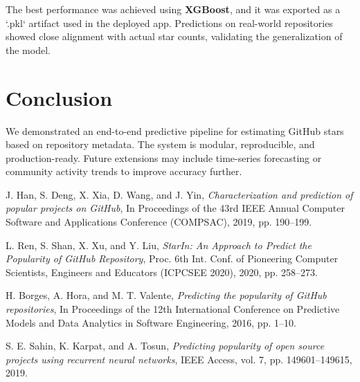 \documentclass[12pt,a4paper]{article}
\begin{document}
The best performance was achieved using \textbf{XGBoost}, and it was exported as a `.pkl` artifact used in the deployed app. Predictions on real-world repositories showed close alignment with actual star counts, validating the generalization of the model.

\section{Conclusion}
We demonstrated an end-to-end predictive pipeline for estimating GitHub stars based on repository metadata. The system is modular, reproducible, and production-ready. Future extensions may include time-series forecasting or community activity trends to improve accuracy further.

\begin{thebibliography}{9}

J. Han, S. Deng, X. Xia, D. Wang, and J. Yin,  
\textit{Characterization and prediction of popular projects on GitHub},  
In Proceedings of the 43rd IEEE Annual Computer Software and Applications Conference (COMPSAC), 2019, pp. 190--199.


 L. Ren, S. Shan, X. Xu, and Y. Liu, \textit{StarIn: An Approach to Predict the Popularity of GitHub Repository}, Proc. 6th Int. Conf. of Pioneering Computer Scientists, Engineers and Educators (ICPCSEE 2020), 2020, pp. 258--273.

H. Borges, A. Hora, and M. T. Valente,
\textit{Predicting the popularity of GitHub repositories},
In Proceedings of the 12th International Conference on Predictive Models and Data Analytics in Software Engineering, 2016, pp. 1--10.

S. E. Sahin, K. Karpat, and A. Tosun,  
\textit{Predicting popularity of open source projects using recurrent neural networks},  
IEEE Access, vol. 7, pp. 149601--149615, 2019.

\end{thebibliography}
\end{document}
